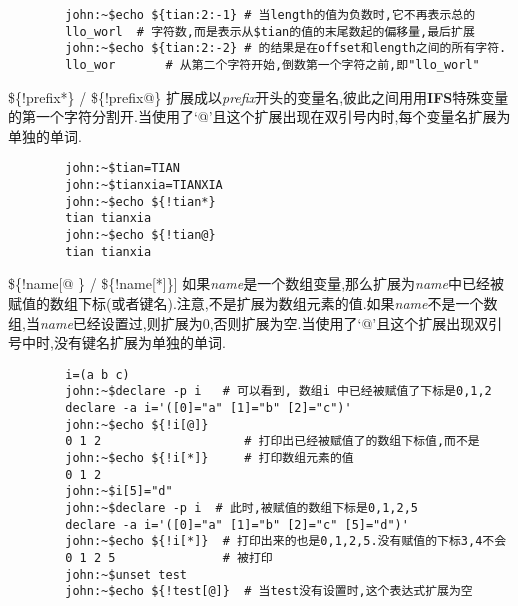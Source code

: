 \documentclass[draft,openany]{book}
\begin{document}
\begin{CJK}{UTF8}{gbsn}
\begin{basedescript}{\desclabelstyle{\nextlinelabel}\desclabelwidth{2.5em}}
\begin{verbatim}
        john:~$echo ${tian:2:-1} # 当length的值为负数时,它不再表示总的
        llo_worl  # 字符数,而是表示从$tian的值的末尾数起的偏移量,最后扩展
        john:~$echo ${tian:2:-2} # 的结果是在offset和length之间的所有字符.
        llo_wor       # 从第二个字符开始,倒数第一个字符之前,即"llo_worl"
        \end{verbatim}
    \item[\$\{!prefix*\} / \$\{!prefix@\}]
        扩展成以\emph{prefix}开头的变量名,彼此之间用用\textbf{IFS}特殊变量的第一个字符分割开.当使用了`@'且这个扩展出现在双引号内时,每个变量名扩展为单独的单词.
        \begin{verbatim}
        john:~$tian=TIAN
        john:~$tianxia=TIANXIA
        john:~$echo ${!tian*}
        tian tianxia
        john:~$echo ${!tian@}
        tian tianxia
        \end{verbatim}
    \item[\$\{!name[@]\} / \$\{!name[*]\}]
        如果\emph{name}是一个数组变量,那么扩展为\emph{name}中已经被赋值的数组下标(或者键名).注意,不是扩展为数组元素的值.如果\emph{name}不是一个数组,当\emph{name}已经设置过,则扩展为0,否则扩展为空.当使用了`@'且这个扩展出现双引号中时,没有键名扩展为单独的单词.
        \begin{verbatim}
        i=(a b c)
        john:~$declare -p i   # 可以看到, 数组i 中已经被赋值了下标是0,1,2
        declare -a i='([0]="a" [1]="b" [2]="c")'
        john:~$echo ${!i[@]}
        0 1 2                    # 打印出已经被赋值了的数组下标值,而不是
        john:~$echo ${!i[*]}     # 打印数组元素的值
        0 1 2
        john:~$i[5]="d"
        john:~$declare -p i  # 此时,被赋值的数组下标是0,1,2,5
        declare -a i='([0]="a" [1]="b" [2]="c" [5]="d")'
        john:~$echo ${!i[*]}  # 打印出来的也是0,1,2,5.没有赋值的下标3,4不会
        0 1 2 5               # 被打印
        john:~$unset test
        john:~$echo ${!test[@]}  # 当test没有设置时,这个表达式扩展为空


\end{verbatim}
\end{basedescript}
\end{CJK}
\end{document}
